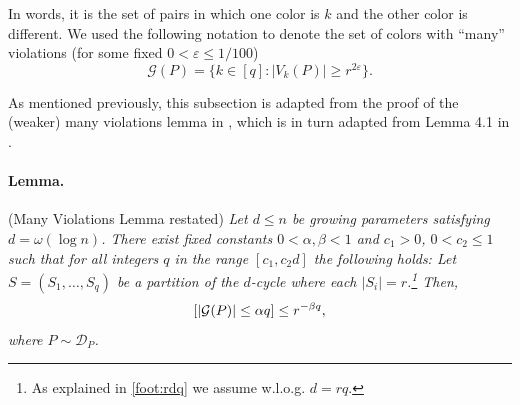 \documentclass[10pt,a4paper]{article}
\theoremstyle{definition}%
\theoremstyle{plain}
\let\Pr\relax
\DeclareMathOperator*{\Pr}{\mathbb{P}}
\newcommand{\eps}{\varepsilon}
\newcommand{\calD}{\mathcal{D}}
\newcommand{\calG}{\mathcal{G}}
\begin{document}
In words, it is the set of pairs in which one color is $k$ and the other color is different. We used the following notation to denote the set of colors with ``many'' violations (for some fixed $0<\eps\leq 1/100$)
$$
\calG(P) = \{k \in [q] : |V_k(P)| \geq r^{2\eps}\}.
$$

As mentioned previously, this subsection is adapted from the proof of the (weaker) many violations lemma in \cite{KushS23}, which is in turn adapted from Lemma 4.1 in \cite{DvirMPY12}. 

\paragraph{Lemma.}(Many Violations Lemma restated) \textit{Let $d\leq n$ be growing parameters satisfying $d = \omega(\log n)$. There exist fixed constants 
$0<\alpha,\beta<1$ and $c_1>0$, $0<c_2\leq 1$ such that for all integers $q$ in the range $ [c_1,c_2d] $ the following holds:
Let $S = (S_1, \ldots, S_q)$ be a partition of the $d$-cycle where each $|S_i| = r$.\footnote{As explained in \autoref{foot:rdq} we assume w.l.o.g. $d=rq$.}
Then,
$$
\Pr[|\calG(P)| \leq \alpha q] \leq r^{-\beta q},
$$
where $P\sim \calD_P$.}
\end{document}
